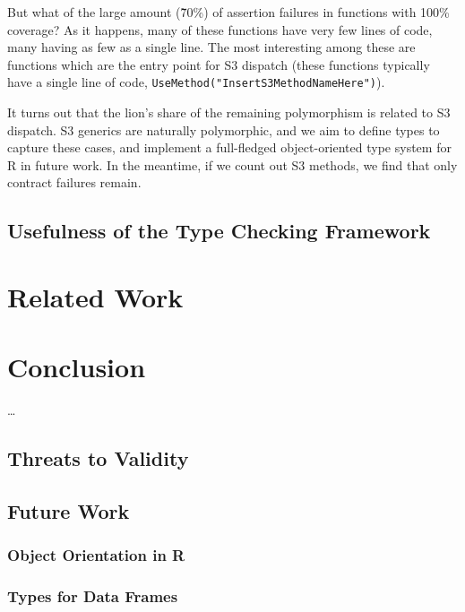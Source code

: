 \documentclass[acmsmall,review,anonymous]{acmart}\settopmatter{printfolios=true,printccs=false,printacmref=false}
\newcommand{\code}[1]{{\lstinline[style=Rin]!#1!}\xspace}
\begin{document}
But what of the large amount (\~70\%) of assertion failures in functions with 100\% coverage?
As it happens, many of these functions have very few lines of code, many having as few as a single line.
The most interesting among these are functions which are the entry point for S3 dispatch (these functions typically have a single line of code, \code{UseMethod("InsertS3MethodNameHere")}).

It turns out that the lion's share of the remaining polymorphism is related to S3 dispatch.
S3 generics are naturally polymorphic, and we aim to define types to capture these cases, and implement a full-fledged object-oriented type system for R in future work.
In the meantime, if we count out S3 methods, we find that only  contract failures remain.

%
%
%
%
\subsection{Usefulness of the Type Checking Framework}


%
%
%
%
%
%
\section{Related Work}
\label{sec:relatedwork}


%
%
%
%
%
%
\section{Conclusion}

\ldots

%
%
%
%
\subsection{Threats to Validity}

%
%
%
%
\subsection{Future Work}

%
%
\subsubsection{Object Orientation in R}

%
%
\subsubsection{Types for Data Frames}

%
%
%


\end{document}
